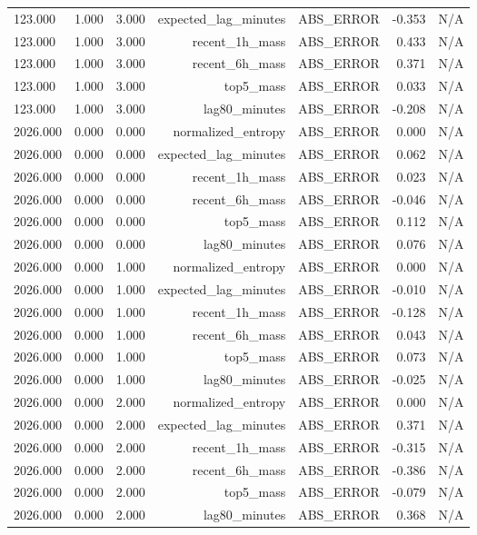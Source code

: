 \begin{table}[h!]
\begin{tabular}{lrrrrrr}
123.000 & 1.000 & 3.000 & expected\_lag\_minutes & ABS\_ERROR & -0.353 & N/A \\
123.000 & 1.000 & 3.000 & recent\_1h\_mass & ABS\_ERROR & 0.433 & N/A \\
123.000 & 1.000 & 3.000 & recent\_6h\_mass & ABS\_ERROR & 0.371 & N/A \\
123.000 & 1.000 & 3.000 & top5\_mass & ABS\_ERROR & 0.033 & N/A \\
123.000 & 1.000 & 3.000 & lag80\_minutes & ABS\_ERROR & -0.208 & N/A \\
2026.000 & 0.000 & 0.000 & normalized\_entropy & ABS\_ERROR & 0.000 & N/A \\
2026.000 & 0.000 & 0.000 & expected\_lag\_minutes & ABS\_ERROR & 0.062 & N/A \\
2026.000 & 0.000 & 0.000 & recent\_1h\_mass & ABS\_ERROR & 0.023 & N/A \\
2026.000 & 0.000 & 0.000 & recent\_6h\_mass & ABS\_ERROR & -0.046 & N/A \\
2026.000 & 0.000 & 0.000 & top5\_mass & ABS\_ERROR & 0.112 & N/A \\
2026.000 & 0.000 & 0.000 & lag80\_minutes & ABS\_ERROR & 0.076 & N/A \\
2026.000 & 0.000 & 1.000 & normalized\_entropy & ABS\_ERROR & 0.000 & N/A \\
2026.000 & 0.000 & 1.000 & expected\_lag\_minutes & ABS\_ERROR & -0.010 & N/A \\
2026.000 & 0.000 & 1.000 & recent\_1h\_mass & ABS\_ERROR & -0.128 & N/A \\
2026.000 & 0.000 & 1.000 & recent\_6h\_mass & ABS\_ERROR & 0.043 & N/A \\
2026.000 & 0.000 & 1.000 & top5\_mass & ABS\_ERROR & 0.073 & N/A \\
2026.000 & 0.000 & 1.000 & lag80\_minutes & ABS\_ERROR & -0.025 & N/A \\
2026.000 & 0.000 & 2.000 & normalized\_entropy & ABS\_ERROR & 0.000 & N/A \\
2026.000 & 0.000 & 2.000 & expected\_lag\_minutes & ABS\_ERROR & 0.371 & N/A \\
2026.000 & 0.000 & 2.000 & recent\_1h\_mass & ABS\_ERROR & -0.315 & N/A \\
2026.000 & 0.000 & 2.000 & recent\_6h\_mass & ABS\_ERROR & -0.386 & N/A \\
2026.000 & 0.000 & 2.000 & top5\_mass & ABS\_ERROR & -0.079 & N/A \\
2026.000 & 0.000 & 2.000 & lag80\_minutes & ABS\_ERROR & 0.368 & N/A \\

\end{tabular}
\end{table}
